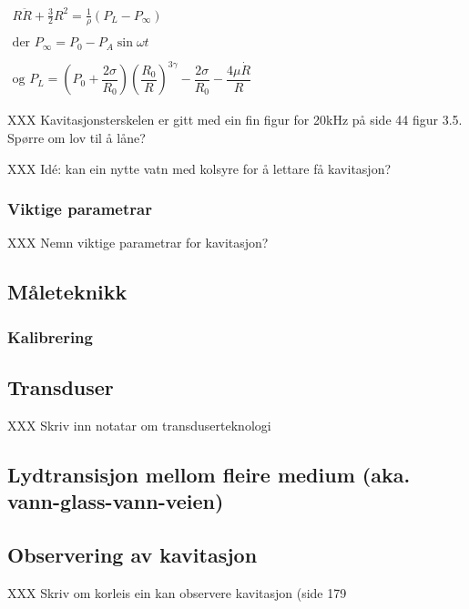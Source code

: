 \begin{math}
\begin{matrix}
R \ddot{R} + \frac{3}{2}R^2 = \frac{1}{\rho} (P_L - P_\infty) \\
\\
\text{der } P_\infty = P_0 - P_A \sin \omega t \\
\\
\text{og } P_L = \left(P_0 +\dfrac{2\sigma}{R_0}\right) \left(\dfrac{R_0}{R}\right)^{3\gamma} - \dfrac{2\sigma}{R_0} - \dfrac{4\mu \dot{R}}{R}
\end{matrix}
\end{math}

XXX Kavitasjonsterskelen er gitt med ein fin figur for 20kHz på side 44 \cite{Young:1999} figur 3.5. Spørre om lov til å låne?

XXX Idé: kan ein nytte vatn med kolsyre for å lettare få kavitasjon?

\subsubsection{Viktige parametrar}

XXX Nemn viktige parametrar for kavitasjon?

\subsection{Måleteknikk}

\subsubsection{Kalibrering}

\subsection{Transduser}

XXX Skriv inn notatar om transduserteknologi

\subsection{Lydtransisjon mellom fleire medium (aka. vann-glass-vann-veien)}


\subsection{Observering av kavitasjon}

XXX Skriv om korleis ein kan observere kavitasjon (side 179 \cite{Young:1999}